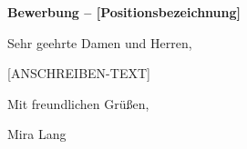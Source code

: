 \documentclass[12pt]{article}
\begin{document}
\textbf{Bewerbung – [Positionsbezeichnung]}

\vspace{0.5cm}

Sehr geehrte Damen und Herren,


[ANSCHREIBEN-TEXT]

\vspace{0.5cm}

Mit freundlichen Grüßen,

\vspace{1cm}

Mira Lang
\end{document}

